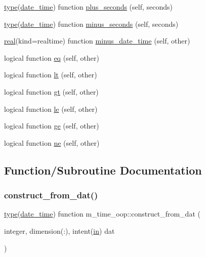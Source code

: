 \begin{DoxyCompactItemize}
\item 
\hyperlink{stop__watch_83_8txt_a70f0ead91c32e25323c03265aa302c1c}{type}(\hyperlink{structm__time__oop_1_1date__time}{date\+\_\+time}) function \hyperlink{namespacem__time__oop_a6830c1cce303ec401ac8e4333a5a73d4}{plus\+\_\+seconds} (self, seconds)
\item 
\hyperlink{stop__watch_83_8txt_a70f0ead91c32e25323c03265aa302c1c}{type}(\hyperlink{structm__time__oop_1_1date__time}{date\+\_\+time}) function \hyperlink{namespacem__time__oop_a395fbf19c6617641aea39c33fd4b2087}{minus\+\_\+seconds} (self, seconds)
\item 
\hyperlink{read__watch_83_8txt_abdb62bde002f38ef75f810d3a905a823}{real}(kind=realtime) function \hyperlink{namespacem__time__oop_a3da83a42a8f957db9bd2f6f0b942ab99}{minus\+\_\+date\+\_\+time} (self, other)
\item 
logical function \hyperlink{namespacem__time__oop_afcc34853af3eda020eb5ff802e04964d}{eq} (self, other)
\item 
logical function \hyperlink{namespacem__time__oop_ab0c5ce86d25993804501d59a8106818f}{lt} (self, other)
\item 
logical function \hyperlink{namespacem__time__oop_a753692f18b6cd100401603d0b88d7c3c}{gt} (self, other)
\item 
logical function \hyperlink{namespacem__time__oop_a5e04ff772ac6d72f68031ec43c1e6c84}{le} (self, other)
\item 
logical function \hyperlink{namespacem__time__oop_aeea1131ab511b897168f00a908b75458}{ge} (self, other)
\item 
logical function \hyperlink{namespacem__time__oop_a7707a7cbd4869301a613ceeb12ed2384}{ne} (self, other)
\end{DoxyCompactItemize}


\subsection{Function/\+Subroutine Documentation}
\mbox{\label{namespacem__time__oop_ae43c4146d74863b5aee027ebc0103f48}} 
\subsubsection{\texorpdfstring{construct\+\_\+from\+\_\+dat()}{construct\_from\_dat()}}
{\footnotesize\ttfamily \hyperlink{stop__watch_83_8txt_a70f0ead91c32e25323c03265aa302c1c}{type}(\hyperlink{structm__time__oop_1_1date__time}{date\+\_\+time}) function m\+\_\+time\+\_\+oop\+::construct\+\_\+from\+\_\+dat (\begin{DoxyParamCaption}\item[{integer, dimension(\+:), intent(\hyperlink{M__journal_83_8txt_afce72651d1eed785a2132bee863b2f38}{in})}]{dat }\end{DoxyParamCaption})\hspace{0.3cm}{\ttfamily [private]}}




